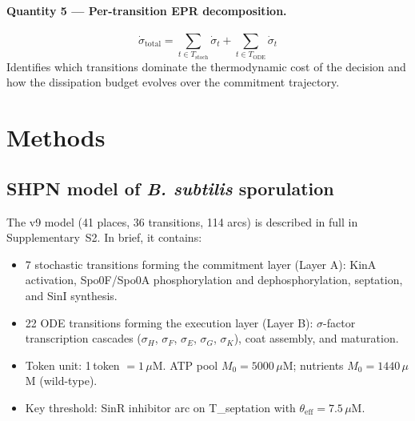 \documentclass[11pt,a4paper]{article}
\newcommand{\thetaeff}{\theta_{\mathrm{eff}}}
\newcommand{\EPR}{\dot{\sigma}}
\begin{document}
\paragraph{Quantity 5 --- Per-transition EPR decomposition.}
\begin{equation}
  \EPR_{\mathrm{total}} = \sum_{t \in T_{\mathrm{stoch}}} \EPR_t
                        + \sum_{t \in T_{\mathrm{ODE}}} \EPR_t
  \label{eq:epr_decomp2}
\end{equation}
Identifies which transitions dominate the thermodynamic cost of the
decision and how the dissipation budget evolves over the commitment
trajectory.

\section{Methods}
\label{sec:methods}

\subsection{SHPN model of \textit{B. subtilis} sporulation}

The v9 model (41 places, 36 transitions, 114 arcs) is described in full
in Supplementary~S2.
In brief, it contains:
\begin{itemize}
  \item 7 stochastic transitions forming the commitment layer (Layer A):
    KinA activation, Spo0F/Spo0A phosphorylation and dephosphorylation,
    septation, and SinI synthesis.
  \item 22 ODE transitions forming the execution layer (Layer B):
    $\sigma$-factor transcription cascades ($\sigma_H$, $\sigma_F$,
    $\sigma_E$, $\sigma_G$, $\sigma_K$), coat assembly, and maturation.
  \item Token unit: 1\,token $= 1\,\mu$M.
    ATP pool $M_0 = 5000\,\mu$M; nutrients $M_0 = 1440\,\mu$M (wild-type).
  \item Key threshold: SinR inhibitor arc on T\_septation with
    $\thetaeff = 7.5\,\mu$M.
\end{itemize}
\end{document}
